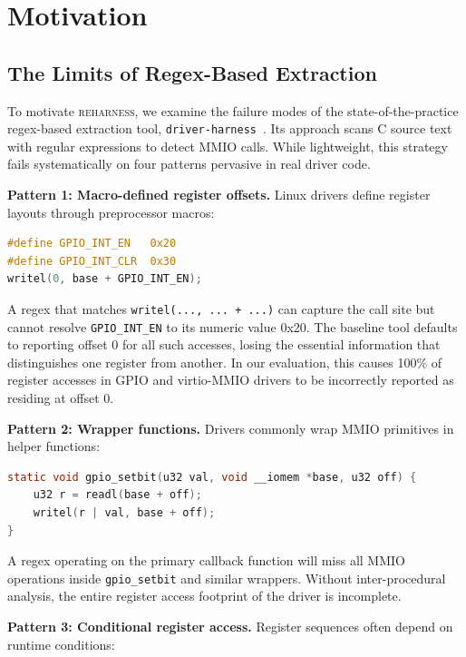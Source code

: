 \documentclass[sigconf,review]{acmart}
\newcommand{\reharness}{\textsc{reharness}}
\begin{document}
\section{Motivation}
\label{sec:motivation}

\subsection{The Limits of Regex-Based Extraction}

To motivate \reharness, we examine the failure modes of the state-of-the-practice regex-based extraction tool, \texttt{driver-harness}~\cite{driverharness}. Its approach scans C source text with regular expressions to detect MMIO calls. While lightweight, this strategy fails systematically on four patterns pervasive in real driver code.

\textbf{Pattern 1: Macro-defined register offsets.} Linux drivers define register layouts through preprocessor macros:

\begin{lstlisting}[language=C]
#define GPIO_INT_EN   0x20
#define GPIO_INT_CLR  0x30
writel(0, base + GPIO_INT_EN);
\end{lstlisting}

A regex that matches \texttt{writel(..., ... + ...)} can capture the call site but cannot resolve \texttt{GPIO\_INT\_EN} to its numeric value 0x20. The baseline tool defaults to reporting offset 0 for all such accesses, losing the essential information that distinguishes one register from another. In our evaluation, this causes 100\% of register accesses in GPIO and virtio-MMIO drivers to be incorrectly reported as residing at offset 0.

\textbf{Pattern 2: Wrapper functions.} Drivers commonly wrap MMIO primitives in helper functions:

\begin{lstlisting}[language=C]
static void gpio_setbit(u32 val, void __iomem *base, u32 off) {
    u32 r = readl(base + off);
    writel(r | val, base + off);
}
\end{lstlisting}

A regex operating on the primary callback function will miss all MMIO operations inside \texttt{gpio\_setbit} and similar wrappers. Without inter-procedural analysis, the entire register access footprint of the driver is incomplete.

\textbf{Pattern 3: Conditional register access.} Register sequences often depend on runtime conditions:
\end{document}
